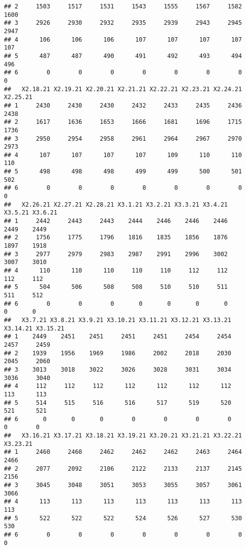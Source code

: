 \documentclass[
]{article}
\begin{document}
\begin{verbatim}
## 2     1503     1517     1531     1543     1555     1567     1582     1600
## 3     2926     2930     2932     2935     2939     2943     2945     2947
## 4      106      106      106      107      107      107      107      107
## 5      487      487      490      491      492      493      494      496
## 6        0        0        0        0        0        0        0        0
##   X2.18.21 X2.19.21 X2.20.21 X2.21.21 X2.22.21 X2.23.21 X2.24.21 X2.25.21
## 1     2430     2430     2430     2432     2433     2435     2436     2438
## 2     1617     1636     1653     1666     1681     1696     1715     1736
## 3     2950     2954     2958     2961     2964     2967     2970     2973
## 4      107      107      107      107      109      110      110      110
## 5      498      498      498      499      499      500      501      502
## 6        0        0        0        0        0        0        0        0
##   X2.26.21 X2.27.21 X2.28.21 X3.1.21 X3.2.21 X3.3.21 X3.4.21 X3.5.21 X3.6.21
## 1     2442     2443     2443    2444    2446    2446    2446    2449    2449
## 2     1756     1775     1796    1816    1835    1856    1876    1897    1918
## 3     2977     2979     2983    2987    2991    2996    3002    3007    3010
## 4      110      110      110     110     110     112     112     112     112
## 5      504      506      508     508     510     510     511     511     512
## 6        0        0        0       0       0       0       0       0       0
##   X3.7.21 X3.8.21 X3.9.21 X3.10.21 X3.11.21 X3.12.21 X3.13.21 X3.14.21 X3.15.21
## 1    2449    2451    2451     2451     2451     2454     2454     2457     2459
## 2    1939    1956    1969     1986     2002     2018     2030     2045     2060
## 3    3013    3018    3022     3026     3028     3031     3034     3036     3040
## 4     112     112     112      112      112      112      112      113      113
## 5     514     515     516      516      517      519      520      521      521
## 6       0       0       0        0        0        0        0        0        0
##   X3.16.21 X3.17.21 X3.18.21 X3.19.21 X3.20.21 X3.21.21 X3.22.21 X3.23.21
## 1     2460     2460     2462     2462     2462     2463     2464     2466
## 2     2077     2092     2106     2122     2133     2137     2145     2156
## 3     3045     3048     3051     3053     3055     3057     3061     3066
## 4      113      113      113      113      113      113      113      113
## 5      522      522      522      524      526      527      530      530
## 6        0        0        0        0        0        0        0        0

\end{verbatim}
\end{document}

